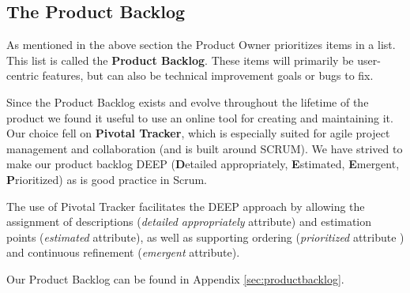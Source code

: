 \subsection{The Product Backlog}

As mentioned in the above section the Product Owner prioritizes items in a list. This list is called the \textbf{Product Backlog}. These items will primarily be user-centric features, but can also be technical improvement goals or bugs to fix.

Since the Product Backlog exists and evolve throughout the lifetime of the product we found it useful to use an online tool for creating and maintaining it. Our choice fell on \textbf{Pivotal Tracker}, which is especially suited for agile project management and collaboration (and is built around SCRUM). We have strived to make our product backlog DEEP (\textbf{D}etailed appropriately, \textbf{E}stimated, \textbf{E}mergent, \textbf{P}rioritized) as is good practice in Scrum.

The use of Pivotal Tracker facilitates the DEEP approach by allowing the assignment of descriptions (\textit{detailed appropriately} attribute) and  estimation points (\textit{estimated} attribute), as well as supporting  ordering (\textit{prioritized} attribute ) and continuous refinement (\textit{emergent} attribute).

Our Product Backlog can be found in Appendix \ref{sec:productbacklog}.